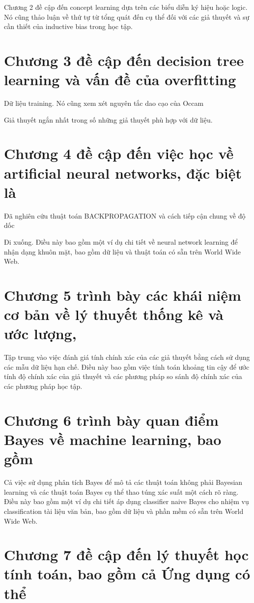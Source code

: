 Chương 2 đề cập đến concept learning dựa trên các biểu diễn ký hiệu hoặc logic. Nó cũng thảo luận về thứ tự từ tổng quát đến cụ thể đối với các giả thuyết và sự cần thiết của inductive bias trong học tập.

\section{Chương 3 đề cập đến decision tree learning và vấn đề của overfitting}

Dữ liệu training. Nó cũng xem xét nguyên tắc dao cạo của Occam

Giả thuyết ngắn nhất trong số những giả thuyết phù hợp với dữ liệu.

\section{Chương 4 đề cập đến việc học về artificial neural networks, đặc biệt là}

Đã nghiên cứu thuật toán BACKPROPAGATION và cách tiếp cận chung về độ dốc

Đi xuống. Điều này bao gồm một ví dụ chi tiết về neural network learning để nhận dạng khuôn mặt, bao gồm dữ liệu và thuật toán có sẵn trên World Wide Web.

\section{Chương 5 trình bày các khái niệm cơ bản về lý thuyết thống kê và ước lượng,}

Tập trung vào việc đánh giá tính chính xác của các giả thuyết bằng cách sử dụng các mẫu dữ liệu hạn chế. Điều này bao gồm việc tính toán khoảng tin cậy để ước tính độ chính xác của giả thuyết và các phương pháp so sánh độ chính xác của các phương pháp học tập.

\section{Chương 6 trình bày quan điểm Bayes về machine learning, bao gồm}

Cả việc sử dụng phân tích Bayes để mô tả các thuật toán không phải Bayesian learning và các thuật toán Bayes cụ thể thao túng xác suất một cách rõ ràng. Điều này bao gồm một ví dụ chi tiết áp dụng classifier naive Bayes cho nhiệm vụ classification tài liệu văn bản, bao gồm dữ liệu và phần mềm có sẵn trên World Wide Web.

\section{Chương 7 đề cập đến lý thuyết học tính toán, bao gồm cả Ứng dụng có thể}

